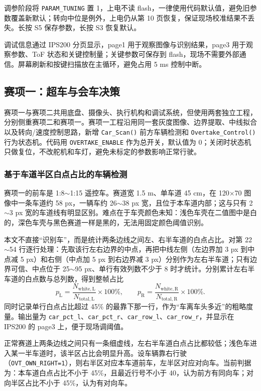 \documentclass{MaiTechReport}
\begin{document}
调参阶段将 \texttt{PARAM\_TUNING} 置 1，上电不读 flash，一律使用代码默认值，避免旧参数覆盖新默认；转向中位是例外，上电仍从第 10 页恢复，保证现场校准结果不丢失。长按 S5 保存参数，长按 S3 恢复默认。

调试信息通过 IPS200 分页显示，page1 用于观察图像与识别结果，page3 用于观察参数、ToF 状态和关键控制量；关键参数可保存到 flash，现场不需要外部通信。屏幕刷新和按键扫描放在主循环，避免占用 5 ms 控制中断。

\subsection{赛项一：超车与会车决策}
\label{sec:overtake}

赛项一与赛项二共用底盘、摄像头、执行机构和调试系统，但使用两套独立工程，分别侧重赛项二和赛项一。赛项一工程沿用同一套灰度图像、边界提取、中线拟合以及转向/速度控制思路，新增 \texttt{Car\_Scan()} 前方车辆检测和 \texttt{Overtake\_Control()} 行为状态机。代码用 \texttt{OVERTAKE\_ENABLE} 作为总开关，默认值为 0；关闭时状态机只做复位，不改舵机和车灯，避免未标定的参数影响正常行驶。

\subsubsection{基于车道半区白点占比的车辆检测}
赛项一的前车是 1:8$\sim$1:15 遥控车。赛道宽 1.5 m、单车道 45 cm，在 120$\times$70 图像中一条车道约 58 px，一辆车约 26$\sim$38 px 宽，且位于本车道内部；这与只有 2$\sim$3 px 宽的车道线有明显区别。难点在于车壳颜色未知：浅色车壳在二值图中是白的，深色车壳与黑色赛道一样是黑的，无法用固定颜色阈值识别。

本文不直接“识别车”，而是统计两条边线之间左、右半车道的白点占比。对第 22$\sim$54 行逐行处理：先取该行左右边界的中点，再把中线左侧（左边界加 3 px 到中点减 5 px）和右侧（中点加 5 px 到右边界减 3 px）分别作为左右半车道；只有边界可信、中点位于 25$\sim$95 px、单行有效列数不少于 8 时才统计。分别累计左右半车道的白点数与总列数，得到整帧占比
\begin{equation}
  p_{\mathrm{L}}=\frac{N_{\mathrm{white,L}}}{N_{\mathrm{total,L}}}\times100\%,\qquad
  p_{\mathrm{R}}=\frac{N_{\mathrm{white,R}}}{N_{\mathrm{total,R}}}\times100\%.
  \label{eq:car_pct}
\end{equation}
同时记录单行白点占比超过 45\% 的最靠下那一行，作为“车离车头多近”的粗略度量。输出量为 \texttt{car\_pct\_l}、\texttt{car\_pct\_r}、\texttt{car\_row\_l}、\texttt{car\_row\_r}，并显示在 IPS200 的 page3 上，便于现场调阈值。

正常赛道上两条边线之间只有一条细虚线，左右半车道白点占比都较低；浅色车进入某一半车道时，该半区占比会明显升高。设车辆靠右行驶（\texttt{OVT\_OWN\_RIGHT=1}），则右半区对应本车道前车，左半区对应对向车。当前判据为：本车道白点占比不小于 45\%，且最近行号不小于 40，认为前方有同向车；对向半区占比不小于 45\%，认为有对向车。
\end{document}
